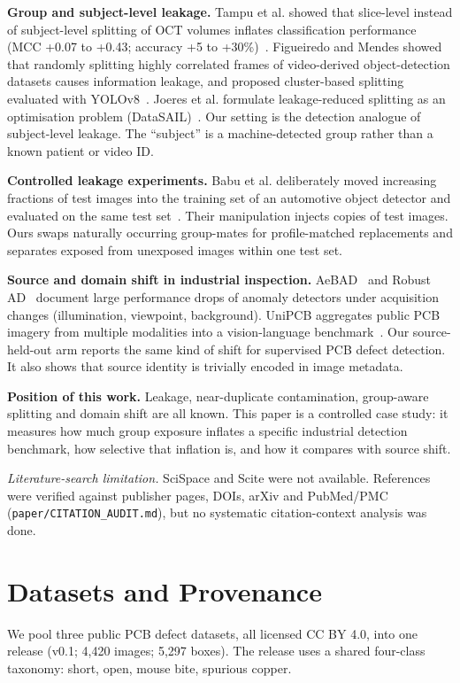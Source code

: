 \documentclass[11pt]{article}
\begin{document}
\textbf{Group and subject-level leakage.} Tampu et al. showed that slice-level instead of subject-level splitting of OCT volumes inflates classification performance (MCC +0.07 to +0.43; accuracy +5 to +30\%)~\cite{tampu2022}. Figueiredo and Mendes showed that randomly splitting highly correlated frames of video-derived object-detection datasets causes information leakage, and proposed cluster-based splitting evaluated with YOLOv8~\cite{figueiredo2024}. Joeres et al. formulate leakage-reduced splitting as an optimisation problem (DataSAIL)~\cite{joeres2025datasail}. Our setting is the detection analogue of subject-level leakage. The ``subject'' is a machine-detected group rather than a known patient or video ID.

\textbf{Controlled leakage experiments.} Babu et al. deliberately moved increasing fractions of test images into the training set of an automotive object detector and evaluated on the same test set~\cite{babu2024leakage}. Their manipulation injects copies of test images. Ours swaps naturally occurring group-mates for profile-matched replacements and separates exposed from unexposed images within one test set.

\textbf{Source and domain shift in industrial inspection.} AeBAD~\cite{zhang2023aebad} and Robust AD~\cite{pemula2025robustad} document large performance drops of anomaly detectors under acquisition changes (illumination, viewpoint, background). UniPCB aggregates public PCB imagery from multiple modalities into a vision-language benchmark~\cite{sun2026unipcb}. Our source-held-out arm reports the same kind of shift for supervised PCB defect detection. It also shows that source identity is trivially encoded in image metadata.

\textbf{Position of this work.} Leakage, near-duplicate contamination, group-aware splitting and domain shift are all known. This paper is a controlled case study: it measures how much group exposure inflates a specific industrial detection benchmark, how selective that inflation is, and how it compares with source shift.

\emph{Literature-search limitation.} SciSpace and Scite were not available. References were verified against publisher pages, DOIs, arXiv and PubMed/PMC (\texttt{paper/CITATION\_AUDIT.md}), but no systematic citation-context analysis was done.

\section{Datasets and Provenance}
We pool three public PCB defect datasets, all licensed CC BY 4.0, into one release (v0.1; 4,420 images; 5,297 boxes). The release uses a shared four-class taxonomy: short, open, mouse bite, spurious copper.
\end{document}
